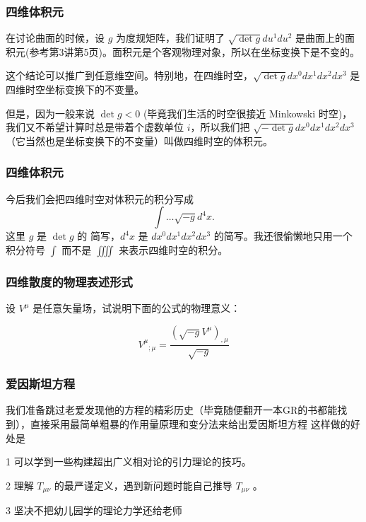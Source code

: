 \documentclass[CJK,13pt]{beamer}
\begin{document}

  \begin{frame}
    \frametitle{四维体积元}
    在讨论曲面的时候，设 $g$ 为度规矩阵，我们证明了 $\sqrt{\det g} du^1du^2$ 是曲面上的面积元(参考第3讲第5页)。面积元是个客观物理对象，所以在坐标变换下是不变的。

    \skiplines

    这个结论可以推广到任意维空间。特别地，在四维时空，$\sqrt{\det g} dx^0dx^1dx^2dx^3$ 是四维时空坐标变换下的不变量。

    \skipline
    
    但是，因为一般来说 $\det g <0$ (毕竟我们生活的时空很接近 Minkowski 时空)，我们又不希望计算时总是带着个虚数单位 $i$，所以我们把 {\blue $\sqrt{-\det g} dx^0dx^1dx^2dx^3$ （它当然也是坐标变换下的不变量）叫做四维时空的体积元}。

  \end{frame}


  \begin{frame}
    \frametitle{四维体积元}    
    今后我们会把四维时空对体积元的积分写成
    $$\int \ldots \sqrt{-g}d^4x.$$
    这里 $g$ 是 $\det g$ 的 简写，$d^4x$ 是 $dx^0dx^1dx^2dx^3$ 的简写。我还很偷懒地只用一个积分符号 $\int$ 而不是 $\iiiint$ 来表示四维时空的积分。


  \end{frame}    


  \begin{frame}
    \frametitle{四维散度的物理表述形式}
    
    设 $V^\mu$ 是任意矢量场，试说明下面的公式的物理意义：

    $$V^\mu_{\ \ \ ;\mu} = \frac{\left(\sqrt{-g}V^\mu\right)_{,\mu}}{\sqrt{-g}} $$
  \end{frame}    
  
  
  \begin{frame}
    \frametitle{爱因斯坦方程}
    我们准备跳过老爱发现他的方程的精彩历史（毕竟随便翻开一本GR的书都能找到），直接采用最简单粗暴的作用量原理和变分法来给出爱因斯坦方程
    这样做的好处是
    \bitem
  \item[1]{可以学到一些构建超出广义相对论的引力理论的技巧。}
  \item[2]{理解 $T_{\mu\nu}$ 的最严谨定义，遇到新问题时能自己推导 $T_{\mu\nu}$ 。}
  \item[3]{坚决不把幼儿园学的理论力学还给老师}
    \eitem
  \end{frame}
\end{document}
